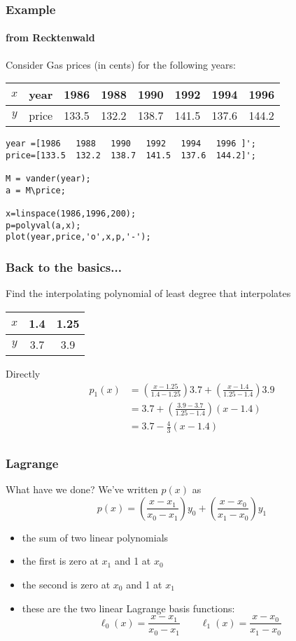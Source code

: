 \documentclass[10pt]{beamer}
\begin{document}
\begin{frame}[fragile]
\frametitle{Example}
\framesubtitle{from Recktenwald}
Consider Gas prices (in cents) for the following years:
\begin{tabular}{c | c | l l l l l l}
$x$ & year  & 1986 & 1988 & 1990 & 1992 & 1994 & 1996 \\\hline
$y$ & price & 133.5& 132.2& 138.7& 141.5& 137.6& 144.2\\
\end{tabular}
\begin{lstlisting}
year =[1986   1988   1990   1992   1994   1996 ]';
price=[133.5  132.2  138.7  141.5  137.6  144.2]';

M = vander(year);
a = M\price;

x=linspace(1986,1996,200);
p=polyval(a,x);
plot(year,price,'o',x,p,'-');
\end{lstlisting}
\end{frame}
\begin{frame}
\frametitle{Back to the basics...}
  \begin{example}
Find the interpolating polynomial of least degree
that interpolates
\begin{center}
  \begin{tabular}{c | c c}
  $x$ & 1.4 & 1.25 \\\hline
  $y$ & 3.7 & 3.9 \\
  \end{tabular}
\end{center}
\end{example}
Directly
  \begin{align*}
    p_1(x) & = \left(\frac{x-1.25}{1.4-1.25}\right) 3.7 +
    \left(\frac{x-1.4}{1.25 - 1.4}\right) 3.9\\
    & =  3.7 + \left(\frac{3.9-3.7}{1.25-1.4}\right)(x-1.4)\\
    & = 3.7 - \frac{4}{3}(x-1.4)\\
  \end{align*}
\end{frame}
\begin{frame}
\frametitle{Lagrange}
What have we done?  We've written $p(x)$ as
\begin{equation*} 
  p(x) = \left(\frac{x-x_1}{x_0-x_1}\right) y_0 + 
         \left(\frac{x-x_0}{x_1-x_0}\right) y_1
\end{equation*}
\begin{itemize}
  \item the sum of two linear polynomials
  \item the first is zero at $x_1$ and 1 at $x_0$
  \item the second is zero at $x_0$ and 1 at $x_1$
  \item these are the two linear Lagrange basis functions:
\begin{equation*}
  \ell_0(x) = \frac{x-x_1}{x_0-x_1}\qquad \ell_1(x) =\frac{x-x_0}{x_1-x_0}
\end{equation*}
\end{itemize}
\end{frame}
\end{document}
